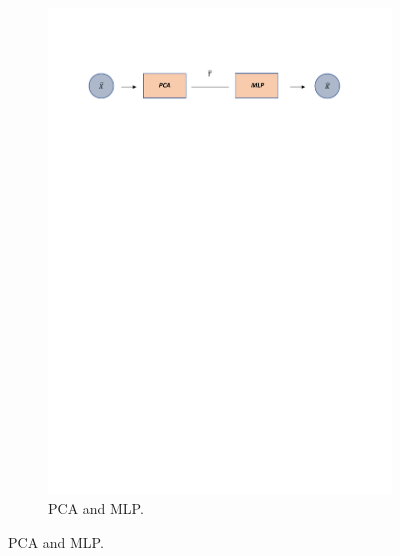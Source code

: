 \begin{figure}[H]
\begin{subfigure}{1\linewidth}  
 \centering
  \includegraphics[width=\linewidth]{Figuras_tfg/Diagram_pca_mlp}
  \caption{PCA and MLP.}
  \label{fig:FigA_PCA_MLP} 
\end{subfigure}


\end{figure}
